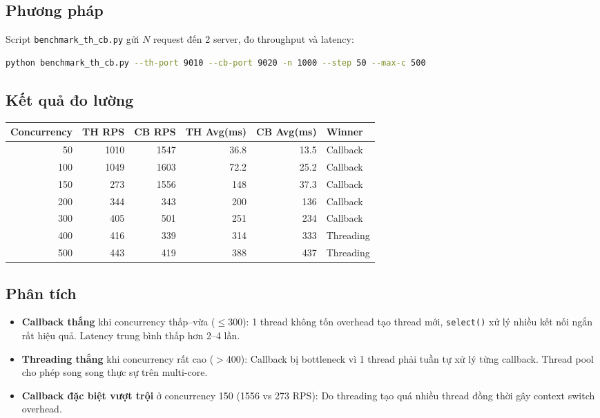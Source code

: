 \documentclass[12pt,a4paper]{article}
\begin{document}
\subsection{Phương pháp}

Script \texttt{benchmark\_th\_cb.py} gửi $N$ request đến 2 server, đo throughput và latency:

\begin{lstlisting}[language=bash]
python benchmark_th_cb.py --th-port 9010 --cb-port 9020 -n 1000 --step 50 --max-c 500
\end{lstlisting}

\subsection{Kết quả đo lường}

\begin{longtable}{|r|r|r|r|r|l|}
\hline
\textbf{Concurrency} & \textbf{TH RPS} & \textbf{CB RPS} & \textbf{TH Avg(ms)} & \textbf{CB Avg(ms)} & \textbf{Winner} \\ \hline
50  & 1010 & 1547 & 36.8 & 13.5 & Callback \\ \hline
100 & 1049 & 1603 & 72.2 & 25.2 & Callback \\ \hline
150 & 273  & 1556 & 148  & 37.3 & Callback \\ \hline
200 & 344  & 343  & 200  & 136  & Callback \\ \hline
300 & 405  & 501  & 251  & 234  & Callback \\ \hline
400 & 416  & 339  & 314  & 333  & Threading \\ \hline
500 & 443  & 419  & 388  & 437  & Threading \\ \hline
\end{longtable}

\subsection{Phân tích}

\begin{itemize}
  \item \textbf{Callback thắng} khi concurrency thấp--vừa ($\leq$300): 1 thread không tốn overhead tạo thread mới, \texttt{select()} xử lý nhiều kết nối ngắn rất hiệu quả. Latency trung bình thấp hơn 2--4 lần.
  \item \textbf{Threading thắng} khi concurrency rất cao ($>$400): Callback bị bottleneck vì 1 thread phải tuần tự xử lý từng callback. Thread pool cho phép song song thực sự trên multi-core.
  \item \textbf{Callback đặc biệt vượt trội} ở concurrency 150 (1556 vs 273 RPS): Do threading tạo quá nhiều thread đồng thời gây context switch overhead.
\end{itemize}
\end{document}
